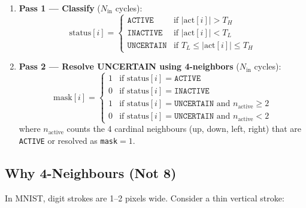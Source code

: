 \documentclass[11pt,a4paper]{article}
\begin{document}
\begin{enumerate}[nosep]
    \item \textbf{Pass 1 — Classify} ($N_{\text{in}}$ cycles):
    \begin{equation}
    \text{status}[i] = \begin{cases}
        \texttt{ACTIVE}    & \text{if } |\text{act}[i]| > T_H \\
        \texttt{INACTIVE}  & \text{if } |\text{act}[i]| < T_L \\
        \texttt{UNCERTAIN} & \text{if } T_L \leq |\text{act}[i]| \leq T_H
    \end{cases}
    \end{equation}

    \item \textbf{Pass 2 — Resolve UNCERTAIN using 4-neighbors} ($N_{\text{in}}$ cycles):
    \begin{equation}
    \text{mask}[i] = \begin{cases}
        1 & \text{if status}[i] = \texttt{ACTIVE} \\
        0 & \text{if status}[i] = \texttt{INACTIVE} \\
        1 & \text{if status}[i] = \texttt{UNCERTAIN} \text{ and } n_{\text{active}} \geq 2 \\
        0 & \text{if status}[i] = \texttt{UNCERTAIN} \text{ and } n_{\text{active}} < 2
    \end{cases}
    \end{equation}
    where $n_{\text{active}}$ counts the 4 cardinal neighbours (up, down, left, right)
    that are \texttt{ACTIVE} or resolved as \texttt{mask}$= 1$.
\end{enumerate}

\subsection{Why 4-Neighbours (Not 8)}

In MNIST, digit strokes are 1--2 pixels wide. Consider a thin vertical stroke:

\begin{center}
\end{center}
\end{document}
